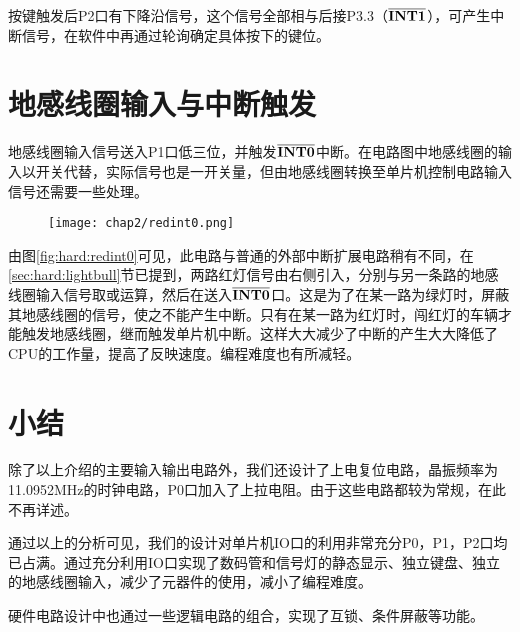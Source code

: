 	按键触发后P2口有下降沿信号，这个信号全部相与后接P3.3（$\bf \overline{INT1}$），可产生中断信号，在软件中再通过轮询确定具体按下的键位。
	
\section{地感线圈输入与中断触发} \label{sec:hard:int0}
	地感线圈输入信号送入P1口低三位，并触发$\bf \overline{INT0}$中断。在电路图中地感线圈的输入以开关代替，实际信号也是一开关量，但由地感线圈转换至单片机控制电路输入信号还需要一些处理。
	
	\begin{figure}[!tbh]
	\centering
	\texttt{[image: chap2/redint0.png]}
	\end{figure}
	
	由图\ref{fig:hard:redint0}可见，此电路与普通的外部中断扩展电路稍有不同，在\ref{sec:hard:lightbull}节已提到，两路红灯信号由右侧引入，分别与另一条路的地感线圈输入信号取或运算，然后在送入$\bf \overline{INT0}$口。这是为了在某一路为绿灯时，屏蔽其地感线圈的信号，使之不能产生中断。只有在某一路为红灯时，闯红灯的车辆才能触发地感线圈，继而触发单片机中断。这样大大减少了中断的产生大大降低了CPU的工作量，提高了反映速度。编程难度也有所减轻。

\section{小结}
除了以上介绍的主要输入输出电路外，我们还设计了上电复位电路，晶振频率为11.0952MHz的时钟电路，P0口加入了上拉电阻。由于这些电路都较为常规，在此不再详述。

通过以上的分析可见，我们的设计对单片机IO口的利用非常充分P0，P1，P2口均已占满。通过充分利用IO口实现了数码管和信号灯的静态显示、独立键盘、独立的地感线圈输入，减少了元器件的使用，减小了编程难度。

硬件电路设计中也通过一些逻辑电路的组合，实现了互锁、条件屏蔽等功能。